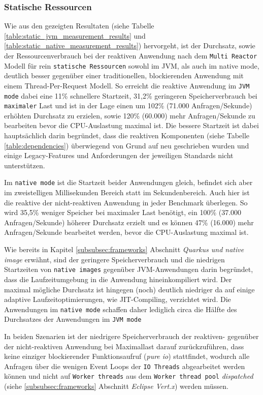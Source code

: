 \subsubsection{Statische Ressourcen}
\label{subsubsec:auswertung_static}
Wie aus den gezeigten Resultaten (siehe Tabelle \ref{table:static_jvm_measurement_results} und
\ref{table:static_native_measurement_results}) hervorgeht, ist der Durchsatz, sowie der Ressourcenverbrauch bei der
reaktiven Anwendung nach dem \verb|Multi Reactor| Modell für rein \verb|statische Ressourcen| sowohl im JVM, als auch im native mode,
deutlich besser gegenüber einer traditionellen, blockierenden Anwendung mit einem Thread-Per-Request Modell.
So erreicht die reaktive Anwendung im \verb|JVM mode| dabei eine 11\% schnellere Startzeit, 31,2\% geringeren Speicherverbrauch bei
\verb|maximaler| Last und ist in der Lage einen um 102\% (71.000 Anfragen/Sekunde) erhöhten Durchsatz zu erzielen,
sowie 120\% (60.000) mehr Anfragen/Sekunde zu bearbeiten bevor die CPU-Auslastung maximal ist.
Die bessere Startzeit ist dabei hauptsächlich darin begründet, dass die reaktiven Komponenten (siehe Tabelle \ref{table:dependencies})
überwiegend von Grund auf neu geschrieben wurden und einige Legacy-Features und Anforderungen der jeweiligen
Standards nicht unterstützen.

Im \verb|native mode| ist die Startzeit beider Anwendungen gleich, befindet sich aber im zweistelligen Millisekunden Bereich statt
im Sekundenbereich.
Auch hier ist die reaktive der nicht-reaktiven Anwendung in jeder Benchmark überlegen. So wird 35,5\% weniger Speicher bei maximaler Last
benötigt, ein 100\% (37.000 Anfragen/Sekunde) höherer  Durchsatz erzielt und es können 47\% (16.000) mehr Anfragen/Sekunde bearbeitet
werden, bevor die CPU-Auslastung maximal ist.

Wie bereits in Kapitel \ref{subsubsec:frameworks} Abschnitt \textit{Quarkus und native image} erwähnt, sind der geringere Speicherverbrauch und
die niedrigen Startzeiten von \verb|native images| gegenüber JVM-Anwendungen darin begründet, dass die Laufzeitumgebung in die
Anwendung hineinkompiliert wird. Der maximal mögliche Durchsatz ist hingegen (noch) deutlich niedriger da auf einige adaptive
Laufzeitoptimierungen, wie JIT-Compiling, verzichtet wird. Die Anwendungen im \verb|native mode| schaffen daher lediglich
circa die Hälfte des Durchsatzes der Anwendungen im \verb|JVM mode|

In beiden Szenarien ist der niedrigere Speicherverbrauch der reaktiven- gegenüber der nicht-reaktiven Anwendung
bei Maximallast darauf zurückzuführen, dass
keine einziger blockierender Funktionsaufruf (\textit{pure io}) stattfindet, wodurch alle Anfragen über die wenigen
Event Loops der \verb|IO Threads| abgearbeitet werden können und nicht auf \verb|Worker threads| aus dem \verb|Worker thread pool|
\textit{dispatched} (siehe \ref{subsubsec:frameworks} Abschnitt \textit{Eclipse Vert.x}) werden müssen.

